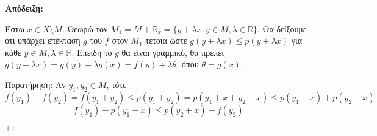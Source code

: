 \textbf{Απόδειξη:} $ $

    
    Έστω $x \in X\setminus M$. Θεωρώ τον $M_1=  M + \mathbb R_x = \{ y + \lambda x: y \in M, \lambda \in \mathbb R\}$. Θα δείξουμε ότι υπάρχει επέκταση $g$ του $f$ στον $M_1$ τέτοια ώστε $g(y+\lambda x) \leq p(y+\lambda x)$ για κάθε $y \in M, \lambda \in \mathbb R$. Επειδή το $g$ θα είναι γραμμικό, θα πρέπει $g(y+\lambda x) = g(y) + \lambda g(x) = f(y) + \lambda \theta$, όπου $\theta = g(x)$.

    
    Παρατήρηση: Αν $y_1,y_2 \in M$, τότε
    $$f(y_1) + f(y_2) = f(y_1+y_2) \leq p(y_1+y_2) = p(y_1+x + y_2 - x) \leq p(y_1 - x) + p(y_2 + x)$$
    $$f(y_1) - p(y_1-x) \leq p(y_2 + x) - f(y_2)$$


    
\hfill $\Box$